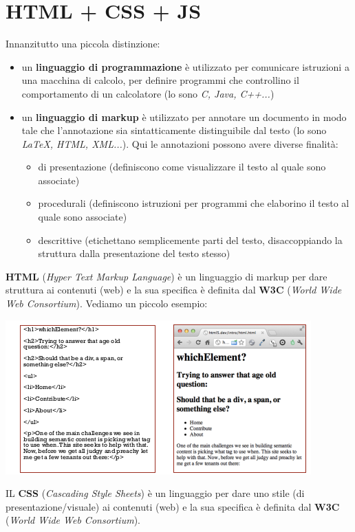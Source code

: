 \documentclass[a4paper,12pt, oneside]{book}
\begin{document}
\chapter{HTML + CSS + JS}
Innanzitutto una piccola distinzione:
\begin{itemize}
\item un \textbf{linguaggio di programmazione} è utilizzato per comunicare istruzioni a
una macchina di calcolo, per definire programmi che controllino il comportamento di un calcolatore (lo sono \textit{C, Java, C++...})
\item un \textbf{linguaggio di markup} è utilizzato per annotare un documento in modo
tale che l'annotazione sia sintatticamente distinguibile dal testo (lo sono \textit{LaTeX, HTML, XML...}). Qui le annotazioni possono avere diverse finalità:
\begin{itemize}
\item di presentazione (definiscono come visualizzare il testo al quale sono associate)
\item procedurali (definiscono istruzioni per programmi che elaborino il testo al quale sono associate)
\item descrittive (etichettano semplicemente parti del testo, disaccoppiando la struttura dalla presentazione del testo stesso)
\end{itemize}
\end{itemize}
\textbf{HTML} (\textit{Hyper Text Markup Language}) è un linguaggio di markup per dare struttura ai contenuti (web) e la sua specifica è definita dal \textbf{W3C} (\textit{World Wide Web Consortium}). 
\newpage
Vediamo un piccolo esempio:
\begin{center}
\includegraphics[scale=0.9]{img/html.png}
\end{center}
IL \textbf{CSS} (\textit{Cascading Style Sheets}) è un linguaggio per dare uno stile (di presentazione/visuale) ai contenuti (web) e la sua specifica è definita dal \textbf{W3C} (\textit{World Wide Web Consortium}). 
\end{document}
